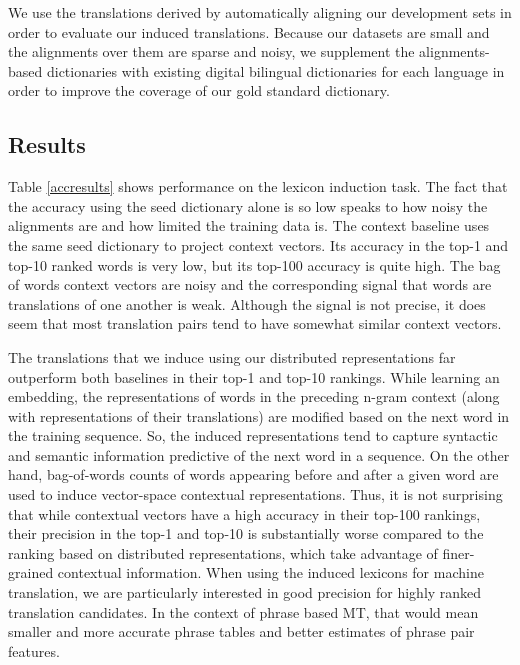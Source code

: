 \documentclass[11pt]{article}
\begin{document}
We use the translations derived by automatically aligning our development sets in order to evaluate our induced translations.
Because our datasets are small and the alignments over them are sparse and noisy, we supplement the alignments-based dictionaries with existing digital bilingual dictionaries for each language in order to improve the coverage of our gold standard dictionary.

\subsection{Results}

Table \ref{accresults} shows performance on the lexicon induction task. 
The fact that the accuracy using the seed dictionary alone is so low speaks to how noisy the alignments are and how limited the training data is.
The context baseline uses the same seed dictionary to project context vectors.
Its accuracy in the top-1 and top-10 ranked words is very low, but its top-100 accuracy is quite high. 
The bag of words context vectors are noisy and the corresponding signal that words are translations of one another is weak. 
Although the signal is not precise, it does seem that most translation pairs tend to have somewhat similar context vectors.

The translations that we induce using our distributed representations far outperform both baselines in their top-1 and top-10 rankings. 
While learning an embedding, the representations of words in the preceding n-gram context (along with representations of their translations) are modified based on the next word in the training sequence.  
So, the induced representations tend to capture syntactic and semantic information predictive of the next word in a sequence.
On the other hand, bag-of-words counts of words appearing before and after a given word are used to induce vector-space contextual representations.  
Thus, it is not surprising that while contextual vectors have a high accuracy in their top-100 rankings, their precision in the top-1 and top-10 is substantially worse compared to the ranking based on distributed representations, which take advantage of finer-grained contextual information.
When using the induced lexicons for machine translation, we are particularly interested in good precision for highly ranked translation candidates. 
In the context of phrase based MT, that would mean smaller and more accurate phrase tables and better estimates of phrase pair features. 
\end{document}
